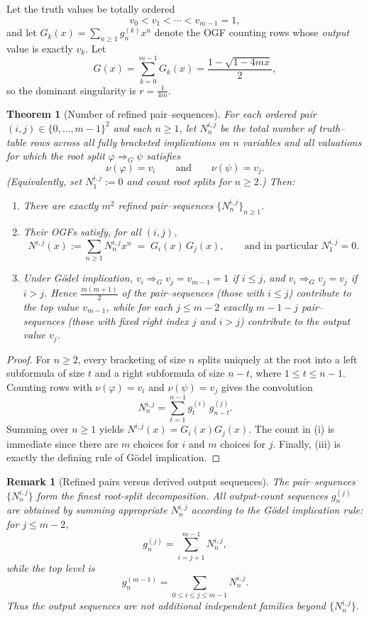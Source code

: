 \documentclass[11pt]{article}
\newtheorem{theorem}{Theorem}
\newtheorem{remark}{Remark}
\begin{document}
Let the truth values be totally ordered
\[
v_0< v_1<\cdots< v_{m-1}=1,
\]
and let $G_k(x)=\sum_{n\ge1} g^{(k)}_n x^n$ denote the OGF counting rows whose \emph{output} value is exactly $v_k$.
Let
\[
G(x)=\sum_{k=0}^{m-1} G_k(x)=\frac{1-\sqrt{1-4mx}}{2},
\]
so the dominant singularity is $r=\frac1{4m}$.

\begin{theorem}[Number of refined pair--sequences]\label{thm:pair-sequences}
For each ordered pair $(i,j)\in\{0,\dots,m-1\}^2$ and each $n\ge 1$, let $N_n^{i,j}$ be the total number of
truth--table rows \emph{across all fully bracketed implications on $n$ variables and all valuations}
for which the root split $\varphi \Rightarrow_G \psi$ satisfies
\[
\nu(\varphi)=v_i \qquad\text{and}\qquad \nu(\psi)=v_j.
\]
(Equivalently, set $N_1^{i,j}:=0$ and count root splits for $n\ge2$.)
Then:
\begin{enumerate}
\item[(i)] There are exactly $m^2$ refined pair--sequences $\{N_n^{i,j}\}_{n\ge 1}$.
\item[(ii)] Their OGFs satisfy, for all $(i,j)$,
\[
N^{i,j}(x):=\sum_{n\ge 1} N_n^{i,j}x^n \;=\; G_i(x)\,G_j(x),
\qquad\text{and in particular } N_1^{i,j}=0.
\]
\item[(iii)] Under G\"odel implication, $v_i \Rightarrow_G v_j = v_{m-1}=1$ if $i\le j$, and
$v_i \Rightarrow_G v_j = v_j$ if $i>j$. Hence $\frac{m(m+1)}{2}$ of the pair--sequences (those with $i\le j$)
contribute to the top value $v_{m-1}$, while for each $j\le m-2$ exactly $m-1-j$ pair--sequences
(those with fixed right index $j$ and $i>j$) contribute to the output value $v_j$.
\end{enumerate}
\end{theorem}

\begin{proof}
For $n\ge2$, every bracketing of size $n$ splits uniquely at the root into a left subformula of size $t$
and a right subformula of size $n-t$, where $1\le t\le n-1$. Counting rows with $\nu(\varphi)=v_i$ and
$\nu(\psi)=v_j$ gives the convolution
\[
N_n^{i,j}=\sum_{t=1}^{n-1} g_t^{(i)}\,g_{n-t}^{(j)}.
\]
Summing over $n\ge1$ yields $N^{i,j}(x)=G_i(x)G_j(x)$. The count in (i) is immediate since there are $m$ choices
for $i$ and $m$ choices for $j$. Finally, (iii) is exactly the defining rule of G\"odel implication.
\end{proof}

\begin{remark}[Refined pairs versus derived output sequences]\label{rem:pairs-vs-outputs}
The pair--sequences $\{N_n^{i,j}\}$ form the finest root-split decomposition. All output-count sequences
$g_n^{(j)}$ are obtained by summing appropriate $N_n^{i,j}$ according to the G\"odel implication rule:
for $j\le m-2$,
\[
g_n^{(j)}=\sum_{i=j+1}^{m-1} N_n^{i,j},
\]
while the top level is
\[
g_n^{(m-1)}=\sum_{0\le i\le j\le m-1} N_n^{i,j}.
\]
Thus the output sequences are \emph{not} additional independent families beyond $\{N_n^{i,j}\}$.
\end{remark}
\end{document}
